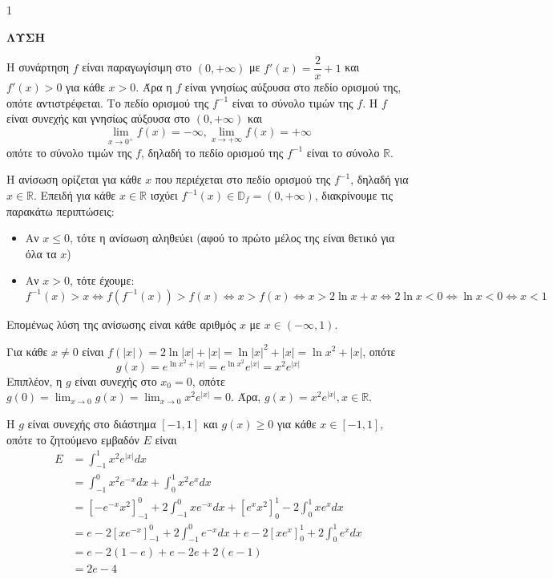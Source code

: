 \begin{ylh}{1}
    \item [Ύλη από εικόνα]
\end{ylh}
\textbf{ΛΥΣΗ}

\begin{alist}
    \item Η συνάρτηση $f$ είναι παραγωγίσιμη στο $(0, +\infty)$ με $f'(x)=\dfrac{2}{x}+1$ και $f'(x)>0$ για κάθε $x>0$.
    Άρα η $f$ είναι γνησίως αύξουσα στο πεδίο ορισμού της, οπότε αντιστρέφεται. Το πεδίο ορισμού της $f^{-1}$ είναι το σύνολο τιμών της $f$. Η $f$ είναι συνεχής και γνησίως αύξουσα στο $(0, +\infty)$ και
    \[ \lim_{x \to 0^+} f(x) = -\infty, \lim_{x \to +\infty} f(x) = +\infty \]
    οπότε το σύνολο τιμών της $f$, δηλαδή το πεδίο ορισμού της $f^{-1}$ είναι το σύνολο $\mathbb{R}$.

    \item Η ανίσωση ορίζεται για κάθε $x$ που περιέχεται στο πεδίο ορισμού της $f^{-1}$, δηλαδή για $x \in \mathbb{R}$. Επειδή για κάθε $x \in \mathbb{R}$ ισχύει $f^{-1}(x) \in \mathbb{D}_f = (0, +\infty)$, διακρίνουμε τις παρακάτω περιπτώσεις:
    \begin{itemize}
        \item Αν $x \le 0$, τότε η ανίσωση αληθεύει (αφού το πρώτο μέλος της είναι θετικό για όλα τα $x$)
        \item Αν $x > 0$, τότε έχουμε:
        \[ f^{-1}(x) > x \iff f(f^{-1}(x)) > f(x) \iff x > f(x) \iff x > 2\ln x + x \iff 2\ln x < 0 \iff \ln x < 0 \iff x < 1 \]
    \end{itemize}
    Επομένως λύση της ανίσωσης είναι κάθε αριθμός $x$ με $x \in (-\infty, 1)$.

    \item
    \begin{rlist}
        \item Για κάθε $x \ne 0$ είναι $f(|x|) = 2\ln|x| + |x| = \ln|x|^2 + |x| = \ln x^2 + |x|$, οπότε
        \[ g(x) = e^{\ln x^2 + |x|} = e^{\ln x^2} e^{|x|} = x^2 e^{|x|} \]
        Επιπλέον, η $g$ είναι συνεχής στο $x_0 = 0$, οπότε $g(0) = \lim_{x \to 0} g(x) = \lim_{x \to 0} x^2 e^{|x|} = 0$.
        Άρα, $g(x) = x^2 e^{|x|}, x \in \mathbb{R}$.

        \item Η $g$ είναι συνεχής στο διάστημα $[-1, 1]$ και $g(x) \ge 0$ για κάθε $x \in [-1, 1]$, οπότε το ζητούμενο εμβαδόν $E$ είναι
        \begin{align*}
            E &= \int_{-1}^{1} x^2 e^{|x|} dx \\
            &= \int_{-1}^{0} x^2 e^{-x} dx + \int_{0}^{1} x^2 e^{x} dx \\
            &= \left[-e^{-x}x^2\right]_{-1}^{0} + 2\int_{-1}^{0} xe^{-x} dx + \left[e^{x}x^2\right]_{0}^{1} - 2\int_{0}^{1} xe^{x} dx \\
            &= e - 2\left[xe^{-x}\right]_{-1}^{0} + 2\int_{-1}^{0} e^{-x} dx + e - 2\left[xe^{x}\right]_{0}^{1} + 2\int_{0}^{1} e^{x} dx \\
            &= e - 2(1-e) + e - 2e + 2(e-1) \\
            &= 2e - 4
        \end{align*}
    \end{rlist}
\end{alist}